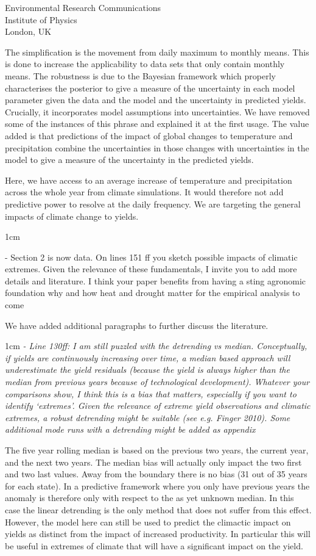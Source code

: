\documentclass{letter}
\newcommand{\review}[1]{   
    \begin{adjustwidth}{1cm}{}
    \em{#1}
    \end{adjustwidth}
    }
\begin{document}
\begin{letter}{Environmental Research Communications \\ Institute of Physics \\ London, UK}
{}

The simplification is the movement from daily maximum to monthly means. This is done to increase the applicability to data sets that only contain monthly means. The robustness is due to the Bayesian framework which properly characterises the posterior to give a measure of the uncertainty in each model parameter given the data and the model and the uncertainty in predicted yields. Crucially, it incorporates model assumptions into uncertainties. We have removed some of the instances of this phrase and explained it at the first usage. The value added is that predictions of the impact of global changes to temperature and precipitation combine the uncertainties in those changes with uncertainties in the model to give a measure of the uncertainty in the predicted yields.

Here, we have access to an average increase of temperature and precipitation across the whole year from climate simulations. It would therefore not add predictive power to resolve at the daily frequency. We are targeting the general impacts of climate change to yields.

\review{
- Section 2 is now data. On lines 151 ff you sketch possible impacts of climatic extremes. Given the relevance of these fundamentals, I invite you to add more details and literature. I think your paper benefits from having a sting agronomic foundation why and how heat and drought matter for the empirical analysis to come

}

We have added additional paragraphs to further discuss the literature. 

\review{
- Line 130ff: I am still puzzled with the detrending vs median. Conceptually, if yields are continuously increasing over time, a median based approach will underestimate the yield residuals (because the yield is always higher than the median from previous years because of technological development). Whatever your comparisons show, I think this is a bias that matters, especially if you want to identify ‘extremes’. Given the relevance of extreme yield observations and climatic extremes, a robust detrending might be suitable (see e.g. Finger 2010). Some additional mode runs with a detrending might be added as appendix
}

The five year rolling median is based on the previous two years, the current year, and the next two years. The median bias will actually only impact the two first and two last values. Away from the boundary there is no bias (31 out of 35 years for each state). In a predictive framework where you only have previous years the anomaly is therefore only with respect to the as yet unknown median. In this case the linear detrending is the only method that does not suffer from this effect. However, the model here can still be used to predict the climactic impact on yields as distinct from the impact of increased productivity. In particular this will be useful in extremes of climate that will have a significant impact on the yield. 


\end{letter}
\end{document}
